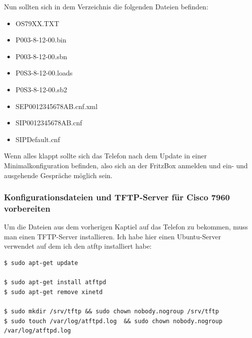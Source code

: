 \documentclass[a4paper,12pt]{scrbook}
\begin{document}
Nun sollten sich in dem Verzeichnis die folgenden Dateien befinden:
\begin{itemize}
 \item OS79XX.TXT  
 \item P003-8-12-00.bin  
 \item P003-8-12-00.sbn  
 \item P0S3-8-12-00.loads
 \item P0S3-8-12-00.sb2
 \item SEP0012345678AB.cnf.xml
 \item SIP0012345678AB.cnf
 \item SIPDefault.cnf
\end{itemize}
Wenn alles klappt sollte sich das Telefon nach dem Update in einer Minimalkonfiguration befinden, also sich an der FritzBox anmelden und ein- und ausgehende Gespräche möglich sein.

\subsubsection{Konfigurationsdateien und TFTP-Server für Cisco 7960 vorbereiten}
Um die Dateien aus dem vorherigen Kaptiel auf das Telefon zu bekommen, muss man einen TFTP-Server installieren. 
Ich habe hier einen Ubuntu-Server verwendet auf dem ich den atftp installiert habe:

\begin{lstlisting}[caption={Installation von atftp unter ubuntu},label=lst:atftpdinstall]
$ sudo apt-get update

$ sudo apt-get install atftpd
$ sudo apt-get remove xinetd

$ sudo mkdir /srv/tftp && sudo chown nobody.nogroup /srv/tftp
$ sudo touch /var/log/atftpd.log  && sudo chown nobody.nogroup /var/log/atftpd.log
\end{lstlisting}
\end{document}
